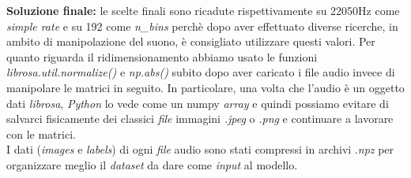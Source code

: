 \textbf{Soluzione finale:} le scelte finali sono ricadute rispettivamente su 22050Hz come \textit{simple rate} e su 192 come \textit{n\_bins} perchè dopo aver effettuato diverse ricerche, in ambito di manipolazione del suono, è consigliato utilizzare questi valori. Per quanto riguarda il ridimensionamento abbiamo usato le funzioni \textit{librosa.util.normalize()} e \textit{np.abs()} subito dopo aver caricato i file audio invece di manipolare le matrici in seguito.
\vspace*{2ex}
\vspace*{2ex}
\noindent In particolare, una volta che l'audio è un oggetto dati \textit{librosa}, \textit{Python} lo vede come un numpy \textit{array} e quindi possiamo evitare di salvarci fisicamente dei classici \textit{file} immagini \textit{.jpeg} o \textit{.png} e continuare a lavorare con le matrici.\\
\newline
I dati (\textit{images} e \textit{labels}) di ogni \textit{file} audio sono stati compressi in archivi .\textit{npz} per organizzare meglio il \textit{dataset} da dare come \textit{input} al modello.
\vspace*{2ex}
\vspace*{2ex}
